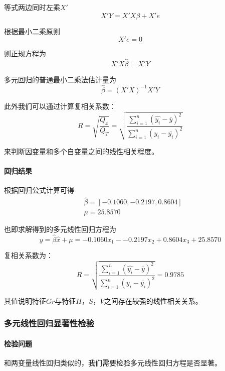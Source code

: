 \documentclass[UTF8]{ctexart}
\begin{document}
	等式两边同时左乘$X'$
	\begin{equation*}
	X'Y = X'X\beta + X'e
	\end{equation*}
	
	根据最小二乘原则
	\begin{equation*}
	X'e = 0
	\end{equation*}
	
	则正规方程为
	\begin{equation*}
	X'X\hat{\beta} = X'Y
	\end{equation*}
	
	多元回归的普通最小二乘法估计量为
	\begin{equation*}
	\hat{\beta} = (X'X)^{-1}X'Y
	\end{equation*}
	
	此外我们可以通过计算复相关系数：
	\begin{equation*}
	R = \sqrt{\frac{Q_x}{Q_T}} = \sqrt{\frac{\sum\limits_{i=1}^{n}(\hat{y_i} - \bar{y})^2}{\sum\limits_{i=1}^{n}(y_i - \bar{y_i})^2}}
	\end{equation*}
	
	来判断因变量和多个自变量之间的线性相关程度。
	
	\paragraph{回归结果} 根据回归公式计算可得
	\begin{align*}
	& \hat{\beta} = [-0.1060, -0.2197, 0.8604]\\
	& \mu = 25.8570
	\end{align*}
	
	也即求解得到的多元线性回归方程为
	\begin{equation*}
	y = \hat{\beta}\hat{x} + \mu = -0.1060x_1 - -0.2197x_2 + 0.8604x_3 + 25.8570
	\end{equation*}
	
	复相关系数为：
	\begin{equation*}
	R = \sqrt{\frac{\sum\limits_{i=1}^{n}(\hat{y_i} - \bar{y})^2}{\sum\limits_{i=1}^{n}(y_i - \bar{y_i})^2}} = 0.9785
	\end{equation*}
	
	其值说明特征$Gr$与特征$H$，$S$，$V$之间存在较强的线性相关关系。
	
	\subsubsection{多元线性回归显著性检验}
	
	\paragraph{检验问题} 和两变量线性回归类似的，我们需要检验多元线性回归方程是否显著。
	
\end{document}
